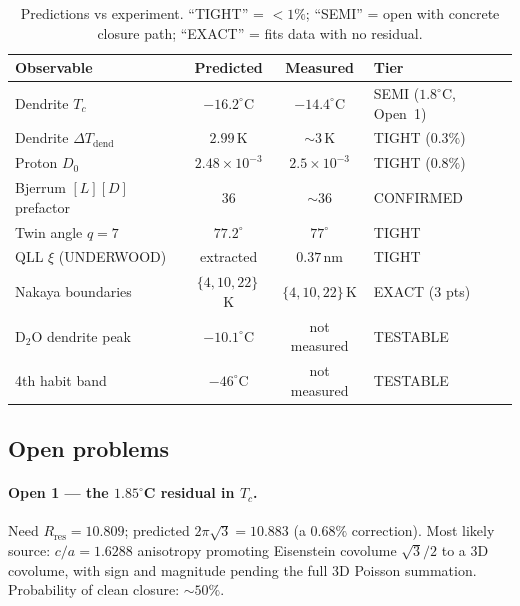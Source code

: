 \documentclass[final]{siamltex}
\newcommand{\Rres}{R_{\text{res}}}
\begin{document}
\begin{table}[h]
\centering
\caption{Predictions vs experiment.  ``TIGHT'' = $<\!1\%$;
``SEMI'' = open with concrete closure path; ``EXACT'' = fits
data with no residual.}
\begin{tabular}{lccl}
\toprule
Observable & Predicted & Measured & Tier \\
\midrule
Dendrite $T_c$               & $-16.2^{\circ}$C            & $-14.4^{\circ}$C        & SEMI ($1.8^{\circ}$C, Open~1) \\
Dendrite $\Delta T_{\text{dend}}$ & $2.99$\,K              & $\sim 3$\,K            & TIGHT ($0.3\%$) \\
Proton $D_0$                  & $2.48 \times 10^{-3}$     & $2.5 \times 10^{-3}$    & TIGHT ($0.8\%$) \\
Bjerrum $[L][D]$ prefactor    & $36$                       & $\sim 36$               & CONFIRMED \\
Twin angle $q=7$              & $77.2^{\circ}$             & $77^{\circ}$            & TIGHT \\
QLL $\xi$ (UNDERWOOD)         & extracted                   & $0.37$\,nm              & TIGHT \\
Nakaya boundaries             & $\{4, 10, 22\}$\,K          & $\{4, 10, 22\}$\,K      & EXACT (3 pts) \\
D$_2$O dendrite peak           & $-10.1^{\circ}$C           & not measured             & TESTABLE \\
4th habit band                & $-46^{\circ}$C              & not measured             & TESTABLE \\
\bottomrule
\end{tabular}
\label{tab:scorecard}
\end{table}

\subsection*{Open problems}

\paragraph{Open 1 --- the $1.85^{\circ}$C residual in $T_c$.}
Need $\Rres = 10.809$; predicted $2\pi\sqrt{3} = 10.883$ (a
$0.68\%$ correction).  Most likely source: $c/a = 1.6288$
anisotropy promoting Eisenstein covolume $\sqrt{3}/2$ to a 3D
covolume, with sign and magnitude pending the full 3D Poisson
summation.  Probability of clean closure: $\sim 50\%$.
\end{document}
